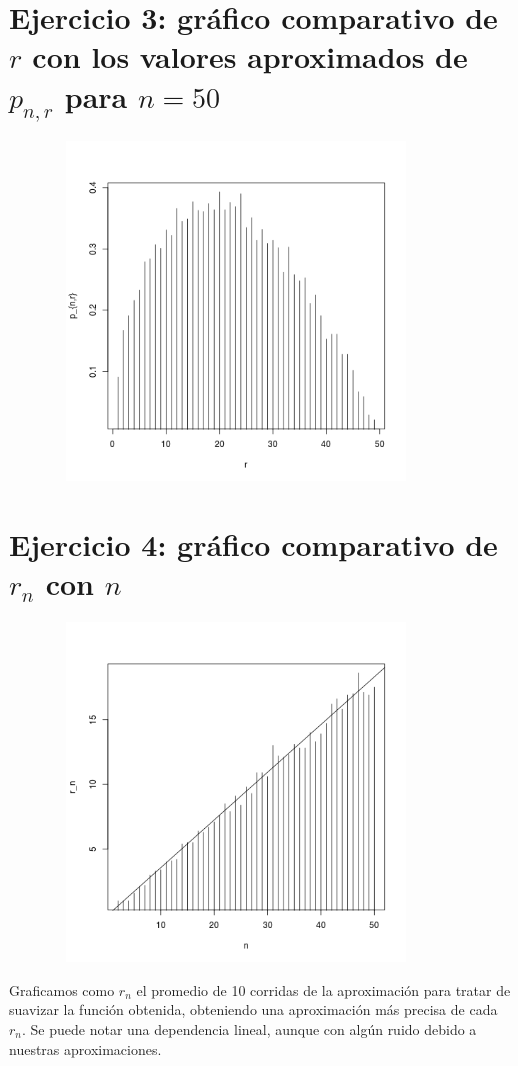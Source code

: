 \documentclass[a4paper]{article}
\begin{document}
\section*{Ejercicio 3: gráfico comparativo de $r$ con los valores aproximados de $p_{n,r}$ para $n=50$}
\includegraphics[width=12cm,height=9cm,keepaspectratio]{ej3.png}\\


\section*{Ejercicio 4: gráfico comparativo de $r_n$ con $n$}
\includegraphics[width=12cm,height=9cm,keepaspectratio]{ej4.png}

Graficamos como $r_n$ el promedio de 10 corridas de la aproximación para tratar de suavizar la función obtenida, obteniendo una aproximación más precisa de cada $r_n$. Se puede notar una dependencia lineal, aunque con algún ruido debido a nuestras aproximaciones.
\end{document}
